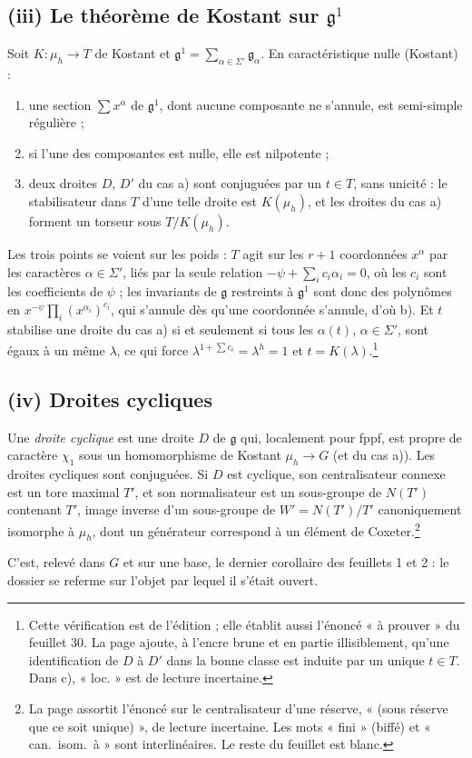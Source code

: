 \documentclass[11pt,a4paper]{article}
\begin{document}
\subsection*{(iii) Le théorème de Kostant sur $\mathfrak{g}^{1}$}

Soit $K\colon\mu_{h}\to T$ de Kostant et
$\mathfrak{g}^{1}=\sum_{\alpha\in\Sigma'}\mathfrak{g}_{\alpha}$. En
caractéristique nulle (Kostant) :

\begin{enumerate}
\item[a)] une section $\sum x^{\alpha}$ de $\mathfrak{g}^{1}$, dont aucune
  composante ne s'annule, est semi-simple régulière ;
\item[b)] si l'une des composantes est nulle, elle est nilpotente ;
\item[c)] deux droites $D$, $D'$ du cas a) sont conjuguées par un $t\in T$,
  sans unicité : le stabilisateur dans $T$ d'une telle droite est $K(\mu_{h})$,
  et les droites du cas a) forment un torseur sous $T/K(\mu_{h})$.
\end{enumerate}

Les trois points se voient sur les poids : $T$ agit sur les $r+1$
coordonnées $x^{\alpha}$ par les caractères $\alpha\in\Sigma'$, liés par la
seule relation $-\psi+\sum_{i}c_{i}\alpha_{i}=0$, où les $c_{i}$ sont les
coefficients de $\psi$ ; les invariants de $\mathfrak{g}$ restreints à
$\mathfrak{g}^{1}$ sont donc des polynômes en
$x^{-\psi}\prod_{i}(x^{\alpha_{i}})^{c_{i}}$, qui s'annule dès qu'une
coordonnée s'annule, d'où b). Et $t$ stabilise une droite du cas a) si et
seulement si tous les $\alpha(t)$, $\alpha\in\Sigma'$, sont égaux à un même
$\lambda$, ce qui force $\lambda^{1+\sum c_{i}}=\lambda^{h}=1$ et
$t=K(\lambda)$.\footnote{Cette vérification est de l'édition ; elle établit
aussi l'énoncé « à prouver » du feuillet 30. La page ajoute, à l'encre brune et
en partie illisiblement, qu'une identification de $D$ à $D'$ dans la bonne
classe est induite par un unique $t\in T$. Dans c), « loc. » est de lecture
incertaine.}

\subsection*{(iv) Droites cycliques}

Une \emph{droite cyclique} est une droite $D$ de $\mathfrak{g}$ qui, localement
pour fppf, est propre de caractère $\chi_{1}$ sous un homomorphisme de Kostant
$\mu_{h}\to G$ (et du cas a)). Les droites cycliques sont conjuguées. Si $D$
est cyclique, son centralisateur connexe est un tore maximal $T'$, et son
normalisateur est un sous-groupe de $N(T')$ contenant $T'$, image inverse
d'un sous-groupe de $W'=N(T')/T'$ canoniquement isomorphe à $\mu_{h}$, dont un
générateur correspond à un élément de Coxeter.\footnote{La page assortit
l'énoncé sur le centralisateur d'une réserve, « (sous réserve que ce soit
unique) », de lecture incertaine. Les mots « fini » (biffé) et « can.\ isom.\
à » sont interlinéaires. Le reste du feuillet est blanc.}

C'est, relevé dans $G$ et sur une base, le dernier corollaire des feuillets 1
et 2 : le dossier se referme sur l'objet par lequel il s'était ouvert.
\end{document}
